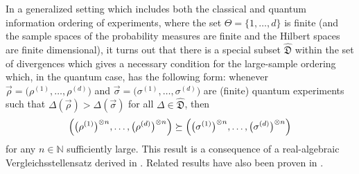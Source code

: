 \documentclass[12pt,a4paper,reqno]{amsart}
\theoremstyle{definition}
\newcommand{\mf}[1]{\mathfrak{#1}}
\newcommand{\N}{\mathbb N}
\let\originalleft\left
\let\originalright\right
\renewcommand{\left}{\mathopen{}\mathclose\bgroup\originalleft}
\renewcommand{\right}{\aftergroup\egroup\originalright}
\begin{document}
In a generalized setting which includes both the classical and quantum information ordering of experiments, where the set $\Theta=\{1,\ldots,d\}$ is finite (and the sample spaces of the probability measures are finite and the Hilbert spaces are finite dimensional), it turns out that there is a special subset $\hat{\mf D}$ within the set of divergences which gives a necessary condition for the large-sample ordering which, in the quantum case, has the following form: whenever $\vec{\rho}=\big(\rho^{(1)},\ldots,\rho^{(d)}\big)$ and $\vec{\sigma}=\big(\sigma^{(1)},\ldots,\sigma^{(d)}\big)$ are (finite) quantum experiments such that $\Delta(\vec{\rho})>\Delta(\vec{\sigma})$ for all $\Delta\in\hat{\mf D}$, then
$$
\left(\big(\rho^{(1)}\big)^{\otimes n},\ldots,\big(\rho^{(d)}\big)^{\otimes n}\right)\succeq\left(\big(\sigma^{(1)}\big)^{\otimes n},\ldots,\big(\sigma^{(d)}\big)^{\otimes n}\right)
$$
for any $n\in\N$ sufficiently large. This result is a consequence of a real-algebraic Vergleichsstellensatz derived in \cite{FritzII}. Related results have also been proven in \cite{FritzI}.
\end{document}
